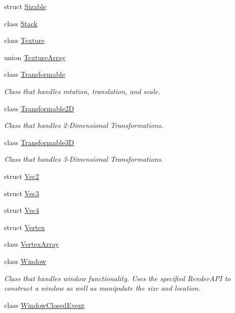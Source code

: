 \begin{DoxyCompactItemize}
\item 
struct \hyperlink{structpcs_1_1Sizable}{Sizable}
\item 
class \hyperlink{classpcs_1_1Stack}{Stack}
\item 
class \hyperlink{classpcs_1_1Texture}{Texture}
\item 
union \hyperlink{unionpcs_1_1TextureArray}{Texture\+Array}
\item 
class \hyperlink{classpcs_1_1Transformable}{Transformable}
\begin{DoxyCompactList}\small\item\em Class that handles rotation, translation, and scale. \end{DoxyCompactList}\item 
class \hyperlink{classpcs_1_1Transformable2D}{Transformable2D}
\begin{DoxyCompactList}\small\item\em Class that handles 2-\/\+Dimensional Transformations. \end{DoxyCompactList}\item 
class \hyperlink{classpcs_1_1Transformable3D}{Transformable3D}
\begin{DoxyCompactList}\small\item\em Class that handles 3-\/\+Dimensional Transformations. \end{DoxyCompactList}\item 
struct \hyperlink{structpcs_1_1Vec2}{Vec2}
\item 
struct \hyperlink{structpcs_1_1Vec3}{Vec3}
\item 
struct \hyperlink{structpcs_1_1Vec4}{Vec4}
\item 
struct \hyperlink{structpcs_1_1Vertex}{Vertex}
\item 
class \hyperlink{classpcs_1_1VertexArray}{Vertex\+Array}
\item 
class \hyperlink{classpcs_1_1Window}{Window}
\begin{DoxyCompactList}\small\item\em Class that handles window functionality. Uses the specified Render\+A\+PI to construct a window as well as manipulate the size and location. \end{DoxyCompactList}\item 
class \hyperlink{classpcs_1_1WindowClosedEvent}{Window\+Closed\+Event}
\end{DoxyCompactItemize}
